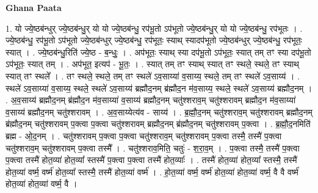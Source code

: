 \documentclass[17pt]{extarticle}
\begin{document}
\textbf{Ghana Paata } \newline

1. यो ज्ये॒ष्ठब॑न्धुर् ज्ये॒ष्ठब॑न्धु॒र् यो यो ज्ये॒ष्ठब॑न्धु॒ रप॑भू॒तो ऽप॑भूतो ज्ये॒ष्ठब॑न्धु॒र् 
यो यो ज्ये॒ष्ठब॑न्धु॒ रप॑भूतः । . ज्ये॒ष्ठब॑न्धु॒ रप॑भू॒तो ऽप॑भूतो ज्ये॒ष्ठब॑न्धुर् ज्ये॒ष्ठब॑न्धु॒ रप॑भूतः॒ स्याथ् स्यादप॑भूतो ज्ये॒ष्ठब॑न्धुर् ज्ये॒ष्ठब॑न्धु॒ रप॑भूतः॒ स्यात् । . ज्ये॒ष्ठब॑न्धु॒रिति॑ ज्ये॒ष्ठ - ब॒न्धुः॒ । . अप॑भूतः॒ स्याथ् स्या दप॑भू॒तो ऽप॑भूतः॒ स्यात् तम् तꣳ स्या दप॑भू॒तो ऽप॑भूतः॒ स्यात् तम् । . अप॑भूत॒ इत्यप॑ - भू॒तः॒ । . स्यात् तम् तꣳ स्याथ् स्यात् तꣳ स्थले॒ स्थले॒ तꣳ स्याथ् स्यात् तꣳ स्थले᳚ । . तꣳ स्थले॒ स्थले॒ तम् तꣳ स्थले॑ ऽव॒साय्या॑ व॒साय्य॒ स्थले॒ तम् तꣳ स्थले॑ ऽव॒साय्य॑ । . स्थले॑ ऽव॒साय्या॑ व॒साय्य॒ स्थले॒ स्थले॑ ऽव॒साय्य॑ ब्रह्मौद॒नम् ब्र॑ह्मौद॒न म॑व॒साय्य॒ स्थले॒ स्थले॑ ऽव॒साय्य॑ ब्रह्मौद॒नम् । . अ॒व॒साय्य॑ ब्रह्मौद॒नम् ब्र॑ह्मौद॒न म॑व॒साय्या॑ व॒साय्य॑ ब्रह्मौद॒नम् चतु॑श्शराव॒म् चतु॑श्शरावम् ब्रह्मौद॒न म॑व॒साय्या॑ व॒साय्य॑ ब्रह्मौद॒नम् चतु॑श्शरावम् । . अ॒व॒साय्येत्य॑व - साय्य॑ । . ब्र॒ह्मौ॒द॒नम् चतु॑श्शराव॒म् चतु॑श्शरावम् ब्रह्मौद॒नम् ब्र॑ह्मौद॒नम् चतु॑श्शरावम् प॒क्त्वा प॒क्त्वा चतु॑श्शरावम् ब्रह्मौद॒नम् ब्र॑ह्मौद॒नम् चतु॑श्शरावम् प॒क्त्वा । . ब्र॒ह्मौ॒द॒नमिति॑ ब्रह्म - ओ॒द॒नम् । . चतु॑श्शरावम् प॒क्त्वा प॒क्त्वा चतु॑श्शराव॒म् चतु॑श्शरावम् प॒क्त्वा तस्मै॒ तस्मै॑ प॒क्त्वा चतु॑श्शराव॒म् चतु॑श्शरावम् प॒क्त्वा तस्मै᳚ । . चतु॑श्शराव॒मिति॒ चतुः॑ - श॒रा॒व॒म् । . प॒क्त्वा तस्मै॒ तस्मै॑ प॒क्त्वा प॒क्त्वा तस्मै॑ होत॒व्या॑ होत॒व्या᳚ स्तस्मै॑ प॒क्त्वा प॒क्त्वा तस्मै॑ होत॒व्याः᳚ । . तस्मै॑ होत॒व्या॑ होत॒व्या᳚ स्तस्मै॒ तस्मै॑ होत॒व्या॑ वर्ष्म॒ वर्ष्म॑ होत॒व्या᳚ स्तस्मै॒ तस्मै॑ होत॒व्या॑ वर्ष्म॑ । . हो॒त॒व्या॑ वर्ष्म॒ वर्ष्म॑ होत॒व्या॑ होत॒व्या॑ वर्ष्म॒ वै वै वर्ष्म॑ होत॒व्या॑ होत॒व्या॑ वर्ष्म॒ वै । \newline
\end{document}
